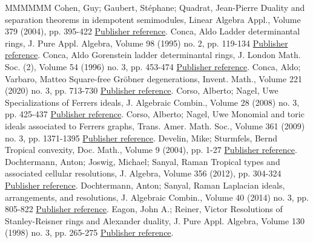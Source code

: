 \begin{thebibliography}{MMMMMM}
 Cohen, Guy; Gaubert, Stéphane; Quadrat, Jean-Pierre Duality and separation theorems in idempotent semimodules, Linear Algebra Appl., Volume 379 (2004), pp. 395-422 \href{https://alco.centre-mersenne.org/articles/10.5802/alco.404/#cohen+gaubert+quadrat}{Publisher reference}.
 Conca, Aldo Ladder determinantal rings, J. Pure Appl. Algebra, Volume 98 (1995) no. 2, pp. 119-134 \href{https://alco.centre-mersenne.org/articles/10.5802/alco.404/#conca1995}{Publisher reference}.
 Conca, Aldo Gorenstein ladder determinantal rings, J. London Math. Soc. (2), Volume 54 (1996) no. 3, pp. 453-474 \href{https://alco.centre-mersenne.org/articles/10.5802/alco.404/#conca1996gorenstein}{Publisher reference}.
 Conca, Aldo; Varbaro, Matteo Square-free Gröbner degenerations, Invent. Math., Volume 221 (2020) no. 3, pp. 713-730 \href{https://alco.centre-mersenne.org/articles/10.5802/alco.404/#conca2020square}{Publisher reference}.
 Corso, Alberto; Nagel, Uwe Specializations of Ferrers ideals, J. Algebraic Combin., Volume 28 (2008) no. 3, pp. 425-437 \href{https://alco.centre-mersenne.org/articles/10.5802/alco.404/#corso2008specializations}{Publisher reference}.
 Corso, Alberto; Nagel, Uwe Monomial and toric ideals associated to Ferrers graphs, Trans. Amer. Math. Soc., Volume 361 (2009) no. 3, pp. 1371-1395 \href{https://alco.centre-mersenne.org/articles/10.5802/alco.404/#corso2009}{Publisher reference}.
 Develin, Mike; Sturmfels, Bernd Tropical convexity, Doc. Math., Volume 9 (2004), pp. 1-27 \href{https://alco.centre-mersenne.org/articles/10.5802/alco.404/#develin2004tropical}{Publisher reference}.
 Dochtermann, Anton; Joswig, Michael; Sanyal, Raman Tropical types and associated cellular resolutions, J. Algebra, Volume 356 (2012), pp. 304-324 \href{https://alco.centre-mersenne.org/articles/10.5802/alco.404/#dochtermann2012tropical}{Publisher reference}.
 Dochtermann, Anton; Sanyal, Raman Laplacian ideals, arrangements, and resolutions, J. Algebraic Combin., Volume 40 (2014) no. 3, pp. 805-822 \href{https://alco.centre-mersenne.org/articles/10.5802/alco.404/#DocSan}{Publisher reference}.
 Eagon, John A.; Reiner, Victor Resolutions of Stanley-Reisner rings and Alexander duality, J. Pure Appl. Algebra, Volume 130 (1998) no. 3, pp. 265-275 \href{https://alco.centre-mersenne.org/articles/10.5802/alco.404/#eagon1998resolutions}{Publisher reference}.

\end{thebibliography}
